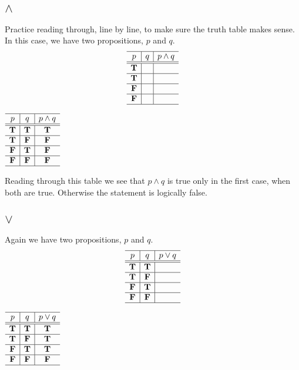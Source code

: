\subsection*{\Huge$\land$}
Practice reading through, line by line, to make sure the truth table makes sense.  In this case, we have two propositions, $p$ and $q$.  
\[   \begin{array}{c|c|c}
  \hline  
  p & q & p\land q\\
  \hline
  \hline
 \mathbf{T} &  &\\
  \hline
 \mathbf{T} &  &  \\
  \hline
 \mathbf{F} & & \\
  \hline
 \mathbf{F} & & \\
  \hline
    \end{array}\]

\ifKey
\color{red}
\hfill 
 $ \begin{array}{c|c|c}
  \hline  
  p & q & p\land q\\
  \hline
  \hline
 \mathbf{T} &  \mathbf{T} &  \mathbf{T}\\
  \hline
 \mathbf{T} &  \mathbf{F} &  \mathbf{F}\\
  \hline
 \mathbf{F} &  \mathbf{T} &  \mathbf{F}\\
  \hline
 \mathbf{F} &  \mathbf{F} &  \mathbf{F}\\
  \hline
    \end{array}$
\color{black}
\fi
    
Reading through this table we see that $p \land q$ is true only in the first case, when both are true.  Otherwise the statement is logically false.
 
\subsection*{\Huge$\lor$}
Again we have two propositions, $p$ and $q$.  
\[  \begin{array}{c|c|c}
  \hline  
  p & q & p\lor q\\
  \hline
  \hline
 \mathbf{T} &   \mathbf{T}  &  \\
  \hline
 \mathbf{T} &  \mathbf{F}   &  \\
  \hline
 \mathbf{F} &  \mathbf{T}   &  \\
  \hline
 \mathbf{F} &   \mathbf{F}  &  \\
  \hline
    \end{array}\]

\ifKey
\color{red}
\hfill 
 $ \begin{array}{c|c|c}
  \hline  
  p & q & p\lor q\\
  \hline
  \hline
 \mathbf{T} &  \mathbf{T}   & \mathbf{T}   \\
  \hline
 \mathbf{T} &  \mathbf{F}   & \mathbf{T}   \\
  \hline
 \mathbf{F} &  \mathbf{T}   &   \mathbf{T} \\
  \hline
 \mathbf{F} &  \mathbf{F}   & \mathbf{F}   \\
  \hline
    \end{array}$
\color{black}
\fi
    
